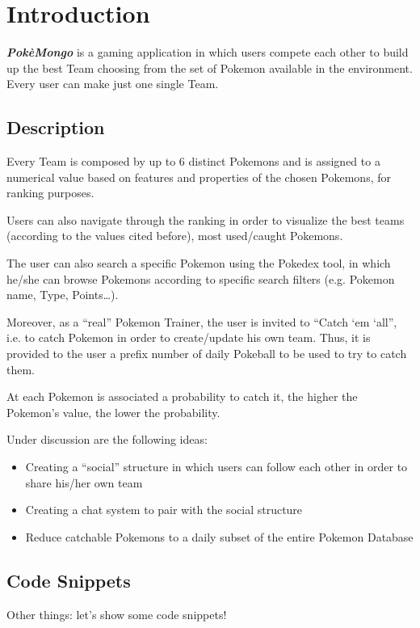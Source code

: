 \chapter{Introduction}
\textbf{\textit{PokèMongo}} is a gaming application in which users compete each other to build up the best Team choosing from the set of Pokemon available in the environment. Every user can make just one single Team. 

\section{Description}
Every Team is composed by up to 6 distinct Pokemons and is assigned to a numerical value based on features and properties of the chosen Pokemons, for ranking purposes.

Users can also navigate through the ranking in order to visualize the best teams (according to the values cited before), most used/caught Pokemons.

The user can also search a specific Pokemon using the Pokedex tool, in which he/she can browse Pokemons according to specific search filters (e.g. Pokemon name, Type, Points…).

Moreover, as a “real” Pokemon Trainer, the user is invited to “Catch ‘em ‘all”, i.e. to catch Pokemon in order to create/update his own team. Thus, it is provided to the user a prefix number of daily Pokeball to be used to try to catch them. 

At each Pokemon is associated a probability to catch it, the higher the Pokemon’s value, the lower the probability.

Under discussion are the following ideas:
\begin{itemize}
    \item Creating a “social” structure in which users can follow each other in order to share his/her own team
    \item Creating a chat system to pair with the social structure 
    \item Reduce catchable Pokemons to a daily subset of the entire Pokemon Database
\end{itemize} 

\section{Code Snippets}
Other things: let's show some code snippets!

